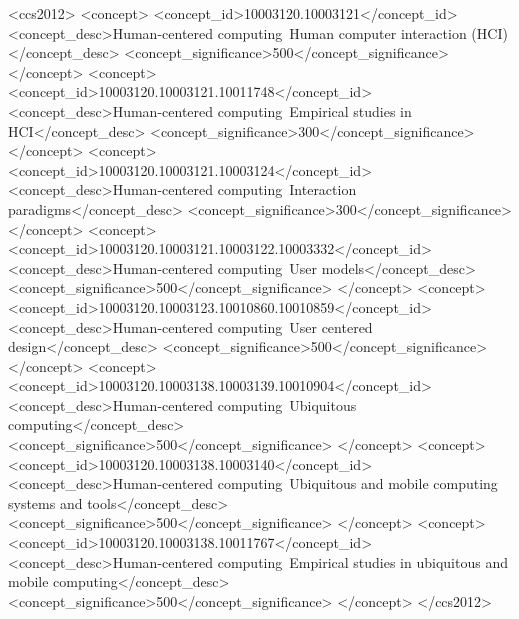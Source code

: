 \documentclass{sigchi}
\begin{document}
	\begin{CCSXML}
		<ccs2012>
		<concept>
		<concept_id>10003120.10003121</concept_id>
		<concept_desc>Human-centered computing~Human computer interaction (HCI)</concept_desc>
		<concept_significance>500</concept_significance>
		</concept>		
		<concept>
		<concept_id>10003120.10003121.10011748</concept_id>
		<concept_desc>Human-centered computing~Empirical studies in HCI</concept_desc>
		<concept_significance>300</concept_significance>
		</concept>
		<concept>
		<concept_id>10003120.10003121.10003124</concept_id>
		<concept_desc>Human-centered computing~Interaction paradigms</concept_desc>
		<concept_significance>300</concept_significance>
		</concept>
		<concept>
		<concept_id>10003120.10003121.10003122.10003332</concept_id>
		<concept_desc>Human-centered computing~User models</concept_desc>
		<concept_significance>500</concept_significance>
		</concept>
		<concept>
		<concept_id>10003120.10003123.10010860.10010859</concept_id>
		<concept_desc>Human-centered computing~User centered design</concept_desc>
		<concept_significance>500</concept_significance>
		</concept>
		<concept>
		<concept_id>10003120.10003138.10003139.10010904</concept_id>
		<concept_desc>Human-centered computing~Ubiquitous computing</concept_desc>
		<concept_significance>500</concept_significance>
		</concept>
		<concept>
		<concept_id>10003120.10003138.10003140</concept_id>
		<concept_desc>Human-centered computing~Ubiquitous and mobile computing systems and tools</concept_desc>
		<concept_significance>500</concept_significance>
		</concept>
		<concept>
		<concept_id>10003120.10003138.10011767</concept_id>
		<concept_desc>Human-centered computing~Empirical studies in ubiquitous and mobile computing</concept_desc>
		<concept_significance>500</concept_significance>
		</concept>
		</ccs2012>
	\end{CCSXML}
	
	
\end{document}
